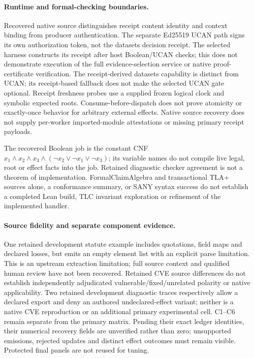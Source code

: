 \paragraph{Runtime and formal-checking boundaries.}
Recovered native source distinguishes receipt content identity and context
binding from producer authentication. The separate Ed25519 UCAN path signs its
own authorization token, not the datasets decision receipt. The selected harness
constructs its receipt after host Boolean/UCAN checks; this does not demonstrate
execution of the full evidence-selection service or native proof-certificate
verification. The receipt-derived datasets capability is distinct from UCAN;
its receipt-based fallback does not make the selected UCAN gate optional.
Receipt freshness probes use a supplied frozen logical clock and symbolic
expected roots. Consume-before-dispatch does not prove atomicity or exactly-once
behavior for arbitrary external effects. Native source recovery does not supply
per-worker imported-module attestations or missing primary receipt payloads.

The recovered Boolean job is the constant CNF
$x_1\land x_2\land x_3\land(\neg x_2\lor\neg x_1\lor\neg x_3)$;
its variable names do not compile live legal, root or effect facts into the job.
Retained diagnostic checker agreement is not a theorem of implementation.
FormalClaimAlgebra and transactional TLA+ sources alone, a conformance summary,
or SANY syntax success do not establish a completed Lean build, TLC invariant
exploration or refinement of the implemented handler.

\paragraph{Source fidelity and separate component evidence.}
One retained development statute example includes quotations, field maps and
declared losses, but emits an empty element list with an explicit parse limitation.
This is an upstream extraction limitation; full source context and qualified
human review have not been recovered. Retained CVE source differences do not
establish independently adjudicated vulnerable/fixed/unrelated polarity or
native applicability. Two retained development diagnostic traces respectively
allow a declared export and deny an authored undeclared-effect variant; neither
is a native CVE reproduction or an additional primary experimental cell.
C1--C6 remain separate from the primary matrix. Pending their exact ledger
identities, their numerical recovery fields are unverified rather than zero;
unsupported emissions, rejected updates and distinct effect outcomes must
remain visible. Protected final panels are not reused for tuning.

